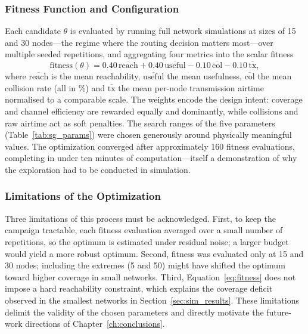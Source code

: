 \documentclass[english,bachelor]{tfgitic}[2026/01/22]
\begin{document}
\subsubsection{Fitness Function and Configuration}
 
Each candidate $\theta$ is evaluated by running full network simulations at sizes of 15 and 30 nodes---the regime where the routing decision matters most---over multiple seeded repetitions, and aggregating four metrics into the scalar fitness
\begin{equation}
    \text{fitness}(\theta) = 0.40\,\overline{\text{reach}} + 0.40\,\overline{\text{useful}} - 0.10\,\overline{\text{col}} - 0.10\,\overline{\text{tx}},
    \label{eq:fitness}
\end{equation}
where $\overline{\text{reach}}$ is the mean reachability, $\overline{\text{useful}}$ the mean usefulness, $\overline{\text{col}}$ the mean collision rate (all in \%) and $\overline{\text{tx}}$ the mean per-node transmission airtime normalised to a comparable scale. The weights encode the design intent: coverage and channel efficiency are rewarded equally and dominantly, while collisions and raw airtime act as soft penalties. The search ranges of the five parameters (Table~\ref{tab:sg_params}) were chosen generously around physically meaningful values. The optimization converged after approximately 160 fitness evaluations, completing in under ten minutes of computation---itself a demonstration of why the exploration had to be conducted in simulation.


\subsubsection{Limitations of the Optimization}
 
Three limitations of this process must be acknowledged. First, to keep the campaign tractable, each fitness evaluation averaged over a small number of repetitions, so the optimum is estimated under residual noise; a larger budget would yield a more robust optimum. Second, fitness was evaluated only at 15 and 30 nodes; including the extremes (5 and 50) might have shifted the optimum toward higher coverage in small networks. Third, Equation~\eqref{eq:fitness} does not impose a hard reachability constraint, which explains the coverage deficit observed in the smallest networks in Section~\ref{sec:sim_results}. These limitations delimit the validity of the chosen parameters and directly motivate the future-work directions of Chapter~\ref{ch:conclusions}.
\end{document}
